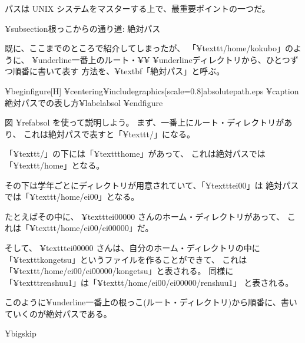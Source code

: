 パスは UNIX システムをマスターする上で、最重要ポイントの一つだ。

¥subsection{根っこからの通り道: 絶対パス}

既に、ここまでのところで紹介してしまったが、
「¥texttt{/home/kokubo}」のように、 ¥underline{一番上のルート・}¥¥
¥underline{ディレクトリから、ひとつずつ順番に書いて表す}
方法を、¥textbf{「絶対パス」}と呼ぶ。

¥begin{figure}[H]
¥centering{¥includegraphics[scale=0.8]{absolutepath.eps}}
¥caption{絶対パスでの表し方}¥label{absol}
¥end{figure}

図 ¥ref{absol} を使って説明しよう。
まず、一番上にルート・ディレクトリがあり、
これは絶対パスで表すと「¥texttt{/}」になる。

「¥texttt{/}」の下には「¥texttt{home}」があって、
これは絶対パスでは「¥texttt{/home}」となる。

その下は学年ごとにディレクトリが用意されていて、「¥texttt{ei00}」は
絶対パスでは「¥texttt{/home/ei00}」となる。

たとえばその中に、 ¥texttt{ei00000} さんのホーム・ディレクトリがあって、
これは「¥texttt{/home/ei00/ei00000}」だ。

そして、 ¥texttt{ei00000} さんは、自分のホーム・ディレクトリの中に
「¥texttt{kongetsu}」というファイルを作ることができて、
これは「¥texttt{/home/ei00/ei00000/kongetsu}」と表される。
同様に「¥texttt{renshuu1}」は「¥texttt{/home/ei00/ei00000/renshuu1}」
と表される。

このように¥underline{一番上の根っこ(ルート・ディレクトリ)から順番に、書いていくのが絶対パス}である。

¥bigskip

